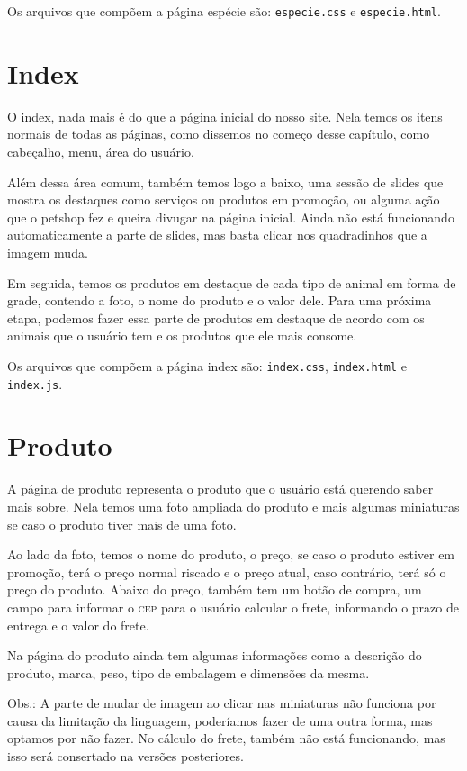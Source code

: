 Os arquivos que compõem a página espécie são: \texttt{especie.css} e \texttt{especie.html}.

\section{Index}
O index, nada mais é do que a página inicial do nosso site. Nela temos os itens normais de todas as
páginas, como dissemos no começo desse capítulo, como cabeçalho, menu, área do usuário.

Além dessa área comum, também temos logo a baixo, uma sessão de slides que mostra os destaques como
serviços ou produtos em promoção, ou alguma ação que o petshop fez e queira divugar na página inicial.
Ainda não está funcionando automaticamente a parte de slides, mas basta clicar nos quadradinhos que a
imagem muda.

Em seguida, temos os produtos em destaque de cada tipo de animal em forma de grade, contendo a foto,
o nome do produto e o valor dele. Para uma próxima etapa, podemos fazer essa parte de produtos em
destaque de acordo com os animais que o usuário tem e os produtos que ele mais consome.

Os arquivos que compõem a página index são: \texttt{index.css}, \texttt{index.html} e
\texttt{index.js}.

\section{Produto}
A página de produto representa o produto que o usuário está querendo saber mais sobre. Nela
temos uma foto ampliada do produto e mais algumas miniaturas se caso o produto tiver mais de
uma foto.

Ao lado da foto, temos o nome do produto, o preço, se caso o produto estiver em promoção, terá
o preço normal riscado e o preço atual, caso contrário, terá só o preço do produto. Abaixo do
preço, também tem um botão de compra, um campo para informar o \textsc{cep} para o usuário
calcular o frete, informando o prazo de entrega e o valor do frete.

Na página do produto ainda tem algumas informações como a descrição do produto, marca, peso,
tipo de embalagem e dimensões da mesma.

Obs.: A parte de mudar de imagem ao clicar nas miniaturas não funciona por causa da limitação da
linguagem, poderíamos fazer de uma outra forma, mas optamos por não fazer. No cálculo do frete,
também não está funcionando, mas isso será consertado na versões posteriores.

